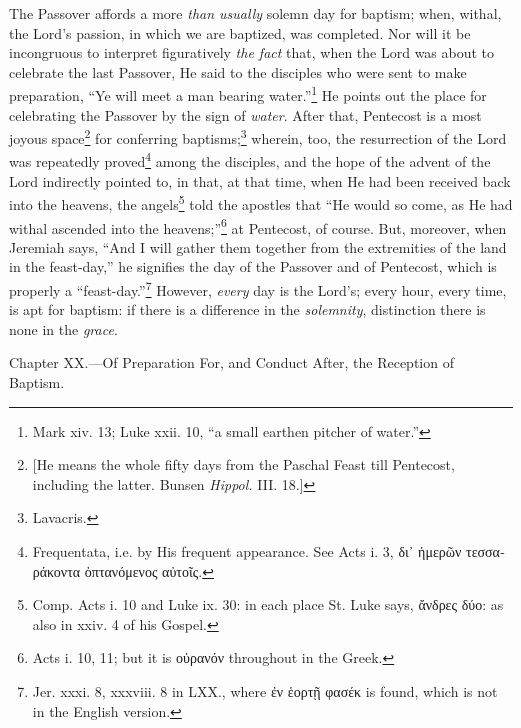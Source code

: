 The Passover affords a more \emph{than usually} solemn day for baptism; when, withal, the Lord’s passion, in which we are baptized, was completed. Nor will it be incongruous to interpret figuratively \emph{the fact} that, when the Lord was about to celebrate the last Passover, He said to the disciples who were sent to make preparation, “Ye will meet a man bearing water.”\footnote{Mark xiv. 13; Luke xxii. 10, “a small earthen pitcher of water.”} He points out the place for celebrating the Passover by the sign of \emph{water}. After that, Pentecost is a most joyous space\footnote{[He means the whole fifty days from the Paschal Feast till Pentecost, including the latter. Bunsen \emph{Hippol.} III. 18.]} for conferring baptisms;\footnote{Lavacris.} wherein, too, the resurrection of the Lord was repeatedly proved\footnote{Frequentata, i.e. by His frequent appearance. See Acts i. 3, \textgreek{δι᾽ ἡμερῶν τεσσαράκοντα ὀπτανόμενος αὐτοῖς}.} among the disciples, and the hope of the advent of the Lord indirectly pointed to, in that, at that time, when He had been received back into the heavens, the angels\footnote{Comp. Acts i. 10 and Luke ix. 30: in each place St. Luke says, \textgreek{ἄνδρες δύο}: as also in xxiv. 4 of his Gospel.} told the apostles that “He would so come, as He had withal ascended into the heavens;”\footnote{Acts i. 10, 11; but it is \textgreek{οὐρανόν} throughout in the Greek.} at Pentecost, of course. But, moreover, when Jeremiah says, “And I will gather them together from the extremities of the land in the feast-day,” he signifies the day of the Passover and of Pentecost, which is properly a “feast-day.”\footnote{Jer. xxxi. 8, xxxviii. 8 in LXX., where \textgreek{ἐν ἑορτῇ φασέκ} is found, which is not in the English version.} However, \emph{every} day is the Lord’s; every hour, every time, is apt for baptism: if there is a difference in the \emph{solemnity}, distinction there is none in the \emph{grace}.


Chapter XX.—Of Preparation For, and Conduct After, the Reception of Baptism.


